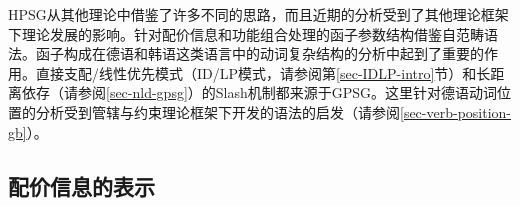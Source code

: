 HPSG从其他理论中借鉴了许多不同的思路，而且近期的分析受到了其他理论框架下理论发展的影响。针对配价信息和功能组合处理的函子参数结构借鉴自范畴语法\indexcgc。函子构成在德语和韩语这类语言中的动词复杂结构的分析中起到了重要的作用。直接支配/线性优先模式（ID/LP模式，请参阅第\ref{sec-IDLP-intro}节）和长距离依存（请参阅\ref{sec-nld-gpsg}）的Slash机制都来源于GPSG\indexgpsgc。这里针对德语动词位置的分析受到管辖与约束理论\indexgbc 框架下开发的语法的启发（请参阅\ref{sec-verb-position-gb}）。

\subsection{配价信息的表示}

